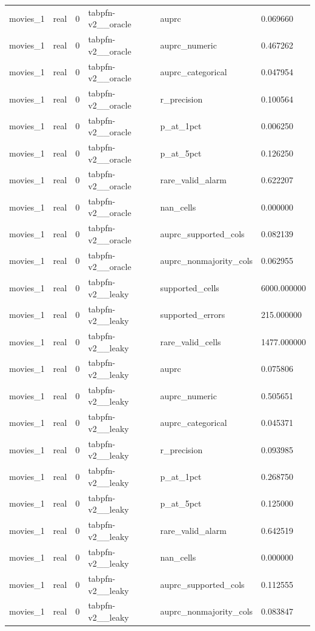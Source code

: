 \begin{tabular}{llllll}
movies\_1 & real & 0 & tabpfn-v2\_\_oracle & auprc & 0.069660 \\
movies\_1 & real & 0 & tabpfn-v2\_\_oracle & auprc\_numeric & 0.467262 \\
movies\_1 & real & 0 & tabpfn-v2\_\_oracle & auprc\_categorical & 0.047954 \\
movies\_1 & real & 0 & tabpfn-v2\_\_oracle & r\_precision & 0.100564 \\
movies\_1 & real & 0 & tabpfn-v2\_\_oracle & p\_at\_1pct & 0.006250 \\
movies\_1 & real & 0 & tabpfn-v2\_\_oracle & p\_at\_5pct & 0.126250 \\
movies\_1 & real & 0 & tabpfn-v2\_\_oracle & rare\_valid\_alarm & 0.622207 \\
movies\_1 & real & 0 & tabpfn-v2\_\_oracle & nan\_cells & 0.000000 \\
movies\_1 & real & 0 & tabpfn-v2\_\_oracle & auprc\_supported\_cols & 0.082139 \\
movies\_1 & real & 0 & tabpfn-v2\_\_oracle & auprc\_nonmajority\_cols & 0.062955 \\
movies\_1 & real & 0 & tabpfn-v2\_\_leaky & supported\_cells & 6000.000000 \\
movies\_1 & real & 0 & tabpfn-v2\_\_leaky & supported\_errors & 215.000000 \\
movies\_1 & real & 0 & tabpfn-v2\_\_leaky & rare\_valid\_cells & 1477.000000 \\
movies\_1 & real & 0 & tabpfn-v2\_\_leaky & auprc & 0.075806 \\
movies\_1 & real & 0 & tabpfn-v2\_\_leaky & auprc\_numeric & 0.505651 \\
movies\_1 & real & 0 & tabpfn-v2\_\_leaky & auprc\_categorical & 0.045371 \\
movies\_1 & real & 0 & tabpfn-v2\_\_leaky & r\_precision & 0.093985 \\
movies\_1 & real & 0 & tabpfn-v2\_\_leaky & p\_at\_1pct & 0.268750 \\
movies\_1 & real & 0 & tabpfn-v2\_\_leaky & p\_at\_5pct & 0.125000 \\
movies\_1 & real & 0 & tabpfn-v2\_\_leaky & rare\_valid\_alarm & 0.642519 \\
movies\_1 & real & 0 & tabpfn-v2\_\_leaky & nan\_cells & 0.000000 \\
movies\_1 & real & 0 & tabpfn-v2\_\_leaky & auprc\_supported\_cols & 0.112555 \\
movies\_1 & real & 0 & tabpfn-v2\_\_leaky & auprc\_nonmajority\_cols & 0.083847 \\

\end{tabular}
